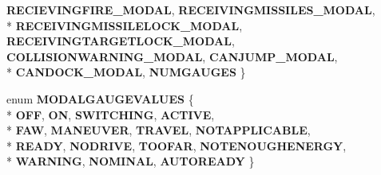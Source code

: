 \begin{DoxyCompactItemize}
{\bfseries R\+E\+C\+I\+E\+V\+I\+N\+G\+F\+I\+R\+E\+\_\+\+M\+O\+D\+AL}, 
{\bfseries R\+E\+C\+E\+I\+V\+I\+N\+G\+M\+I\+S\+S\+I\+L\+E\+S\+\_\+\+M\+O\+D\+AL}, 
\\*
{\bfseries R\+E\+C\+E\+I\+V\+I\+N\+G\+M\+I\+S\+S\+I\+L\+E\+L\+O\+C\+K\+\_\+\+M\+O\+D\+AL}, 
{\bfseries R\+E\+C\+E\+I\+V\+I\+N\+G\+T\+A\+R\+G\+E\+T\+L\+O\+C\+K\+\_\+\+M\+O\+D\+AL}, 
{\bfseries C\+O\+L\+L\+I\+S\+I\+O\+N\+W\+A\+R\+N\+I\+N\+G\+\_\+\+M\+O\+D\+AL}, 
{\bfseries C\+A\+N\+J\+U\+M\+P\+\_\+\+M\+O\+D\+AL}, 
\\*
{\bfseries C\+A\+N\+D\+O\+C\+K\+\_\+\+M\+O\+D\+AL}, 
{\bfseries N\+U\+M\+G\+A\+U\+G\+ES}
 \}\hypertarget{structUnitImages_a57adbbbfbbcf3c9f27ed80485ce06f12}{}\label{structUnitImages_a57adbbbfbbcf3c9f27ed80485ce06f12}

\item 
enum {\bfseries M\+O\+D\+A\+L\+G\+A\+U\+G\+E\+V\+A\+L\+U\+ES} \{ \\*
{\bfseries O\+FF}, 
{\bfseries ON}, 
{\bfseries S\+W\+I\+T\+C\+H\+I\+NG}, 
{\bfseries A\+C\+T\+I\+VE}, 
\\*
{\bfseries F\+AW}, 
{\bfseries M\+A\+N\+E\+U\+V\+ER}, 
{\bfseries T\+R\+A\+V\+EL}, 
{\bfseries N\+O\+T\+A\+P\+P\+L\+I\+C\+A\+B\+LE}, 
\\*
{\bfseries R\+E\+A\+DY}, 
{\bfseries N\+O\+D\+R\+I\+VE}, 
{\bfseries T\+O\+O\+F\+AR}, 
{\bfseries N\+O\+T\+E\+N\+O\+U\+G\+H\+E\+N\+E\+R\+GY}, 
\\*
{\bfseries W\+A\+R\+N\+I\+NG}, 
{\bfseries N\+O\+M\+I\+N\+AL}, 
{\bfseries A\+U\+T\+O\+R\+E\+A\+DY}
 \}\hypertarget{structUnitImages_ae283012ee23a33e5f6e6e9ce53868abb}{}\label{structUnitImages_ae283012ee23a33e5f6e6e9ce53868abb}

\end{DoxyCompactItemize}
